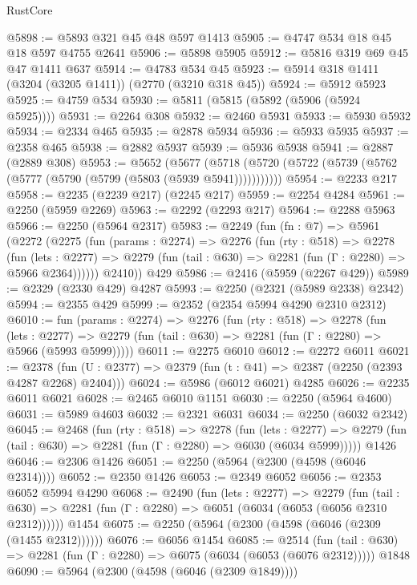 \begin{lexlean}{RustCore}
\begin{coremodule}
@5898 := @5893 @321 @45 @48 @597 @1413
@5905 := @4747 @534 @18 @45 @18 @597 @4755 @2641
@5906 := @5898 @5905
@5912 := @5816 @319 @69 @45 @47 @1411 @637
@5914 := @4783 @534 @45
@5923 := @5914 @318 @1411 (@3204 (@3205 @1411)) (@2770 (@3210 @318 @45))
@5924 := @5912 @5923
@5925 := @4759 @534
@5930 := @5811 (@5815 (@5892 (@5906 (@5924 @5925))))
@5931 := @2264 @308
@5932 := @2460 @5931
@5933 := @5930 @5932
@5934 := @2334 @465
@5935 := @2878 @5934
@5936 := @5933 @5935
@5937 := @2358 @465
@5938 := @2882 @5937
@5939 := @5936 @5938
@5941 := @2887 (@2889 @308)
@5953 := @5652
    (@5677 (@5718 (@5720 (@5722 (@5739 (@5762 (@5777 (@5790 (@5799 (@5803 (@5939 @5941)))))))))))
@5954 := @2233 @217
@5958 := @2235 (@2239 @217) (@2245 @217)
@5959 := @2254 @4284
@5961 := @2250 (@5959 @2269)
@5963 := @2292 (@2293 @217)
@5964 := @2288 @5963
@5966 := @2250 (@5964 @2317)
@5983 := @2249
    (fun (fn : @7) =>
    @5961
      (@2272
        (@2275
          (fun (params : @2274) =>
          @2276
            (fun (rty : @518) =>
            @2278
              (fun (lets : @2277) =>
              @2279 (fun (tail : @630) => @2281 (fun (Γ : @2280) => @5966 @2364))))))
        @2410))
    @429
@5986 := @2416 (@5959 (@2267 @429))
@5989 := @2329 (@2330 @429) @4287
@5993 := @2250 (@2321 (@5989 @2338) @2342)
@5994 := @2355 @429
@5999 := @2352 (@2354 @5994 @4290 @2310 @2312)
@6010 := fun (params : @2274) =>
  @2276
    (fun (rty : @518) =>
    @2278
      (fun (lets : @2277) =>
      @2279 (fun (tail : @630) => @2281 (fun (Γ : @2280) => @5966 (@5993 @5999)))))
@6011 := @2275 @6010
@6012 := @2272 @6011
@6021 := @2378 (fun (U : @2377) => @2379 (fun (t : @41) => @2387 (@2250 (@2393 @4287 @2268) @2404)))
@6024 := @5986 (@6012 @6021) @4285
@6026 := @2235 @6011 @6021
@6028 := @2465 @6010 @1151
@6030 := @2250 (@5964 @4600)
@6031 := @5989 @4603
@6032 := @2321 @6031
@6034 := @2250 (@6032 @2342)
@6045 := @2468
    (fun (rty : @518) =>
    @2278
      (fun (lets : @2277) =>
      @2279 (fun (tail : @630) => @2281 (fun (Γ : @2280) => @6030 (@6034 @5999)))))
    @1426
@6046 := @2306 @1426
@6051 := @2250 (@5964 (@2300 (@4598 (@6046 @2314))))
@6052 := @2350 @1426
@6053 := @2349 @6052
@6056 := @2353 @6052 @5994 @4290
@6068 := @2490
    (fun (lets : @2277) =>
    @2279
      (fun (tail : @630) => @2281 (fun (Γ : @2280) => @6051 (@6034 (@6053 (@6056 @2310 @2312))))))
    @1454
@6075 := @2250 (@5964 (@2300 (@4598 (@6046 (@2309 (@1455 @2312))))))
@6076 := @6056 @1454
@6085 := @2514
    (fun (tail : @630) => @2281 (fun (Γ : @2280) => @6075 (@6034 (@6053 (@6076 @2312)))))
    @1848
@6090 := @5964 (@2300 (@4598 (@6046 (@2309 @1849))))

\end{coremodule}
\end{lexlean}
